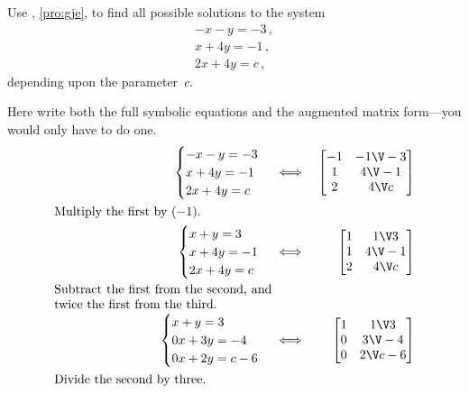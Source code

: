 \begin{example} \label{eg:gjea}
Use , \cref{pro:gje}, to find all possible solutions to the system
\begin{equation*}
\begin{array}{l}
-x-y=-3\,,\\x+4y=-1\,,\\2x+4y=c\,,
\end{array}
\end{equation*}
depending upon the parameter~\(c\).

\begin{solution} 
Here write both the full symbolic equations and the augmented matrix form---you would only have to do one.
\begin{eqnarray*}
\begin{cases}
-x-y=-3\\x+4y=-1\\2x+4y=c
\end{cases}
&\iff&%
\begin{bmatrix} -1&-1\V-3\\1&4\V-1\\2&4\V c \end{bmatrix}
\\
\parbox{0.5\linewidth}{Multiply the first by~\((-1)\).}
\\
\begin{cases}
x+y=3\\x+4y=-1\\2x+4y=c
\end{cases}
&\iff&%
\begin{bmatrix} 1&1\V3\\1&4\V-1\\2&4\V c \end{bmatrix}
\\
\parbox{0.5\linewidth}{Subtract the first from the second, and twice the first from the third.}
\\
\begin{cases}
x+y=3\\0x+3y=-4\\0x+2y=c-6
\end{cases}
&\iff&%
\begin{bmatrix} 1&1\V3\\0&3\V-4\\0&2\V c-6 \end{bmatrix}
\\
\parbox{0.5\linewidth}{Divide the second by three.}
\\

\end{eqnarray*}
\end{solution}
\end{example}
